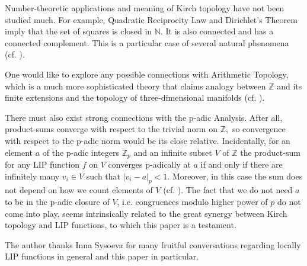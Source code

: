 \documentclass[10pt]{article}
\theoremstyle{definition}
\begin{document}
Number-theoretic applications and meaning of Kirch topology have not been studied much. For example, Quadratic Reciprocity Law and Dirichlet's Theorem imply that the set of squares is closed in $\mathbb N.$ It is also connected and has a connected complement. This is a particular case of several natural phenomena (cf. \cite{BorisovSengupta}).

One would like to explore any possible connections with Arithmetic Topology, which is a much more sophisticated theory that claims analogy between $\mathbb Z$ and its finite extensions and the topology of three-dimensional manifolds (cf. \cite{Morishita}).

There must also exist strong connections with the p-adic Analysis. After all, product-sums converge with respect to the trivial norm on $\mathbb Z,$ so convergence with respect to the p-adic norm would be its close relative. Incidentally, for an element $a$ of the p-adic integers $\mathbb Z_p$ and an infinite subset $V$ of $\mathbb Z$ the product-sum for any LIP function $f$ on $V$ converges p-adically at $a$ if and only if there are infinitely many $v_i\in V$ such that $|v_i-a|_p <1.$ Moreover, in this case the sum does not depend on how we count elements of $V$ (cf. \cite{MithunThesis}). The fact that we do not need $a$ to be in the p-adic closure of $V$, i.e. congruences modulo higher power of $p$ do not come into play, seems intrinsically related to the great synergy between Kirch topology and LIP functions, to which this paper is a testament.

\vskip10pt The author thanks Inna Sysoeva for many fruitful conversations regarding locally LIP functions in general and this paper in particular. 
\end{document}
